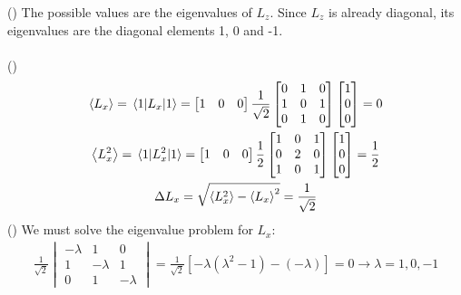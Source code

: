 \documentclass{report}
\theoremstyle{definition}
\newcounter{subpart1}[chapter1]
\begin{document}
\begin{chapter4}\label{prob: 1}
		()
		The possible values are the eigenvalues of $L_z$. Since $L_z$ is already diagonal, its eigenvalues are the diagonal elements 1, 0 and -1. \\\\
		()
		\begin{gather*}
			\ev{L_x} = \expval{L_x}{1} = 
			\begin{bmatrix}
				1 & 0 & 0
			\end{bmatrix}
			\frac{1}{\sqrt{2}}
			\begin{bmatrix}
				0 & 1 & 0 \\
				1 & 0 & 1 \\
				0 & 1 & 0
			\end{bmatrix}
			\begin{bmatrix}
				1 \\
				0 \\
				0 \\
			\end{bmatrix}
			= 0 \\
			\ev{L^2_x} = \ev{L^2_x}{1} = 
			\begin{bmatrix}
				1 & 0 & 0
			\end{bmatrix}
			\frac{1}{2}
			\begin{bmatrix}
				1 & 0 & 1 \\
				0 & 2 & 0 \\
				1 & 0 & 1
			\end{bmatrix}
			\begin{bmatrix}
				1 \\
				0 \\
				0 \\
			\end{bmatrix}
			= \frac{1}{2} \\
			\Delta L_x = \sqrt{\ev{L^2_x} - \ev{L_x}^2} = \frac{1}{\sqrt{2}}
		\end{gather*}
		()
		We must solve the eigenvalue problem for $L_x$:
		\begin{gather*}
			\frac{1}{\sqrt{2}}
			\begin{vmatrix}
				-\lambda & 1 & 0 \\
				1 & -\lambda & 1 \\
				0 & 1 & -\lambda
			\end{vmatrix}
			= \frac{1}{\sqrt{2}}[-\lambda(\lambda^2 -1) - (-\lambda)] = 0 \longrightarrow \lambda = 1, 0, -1

\end{gather*}
\end{chapter4}
\end{document}
